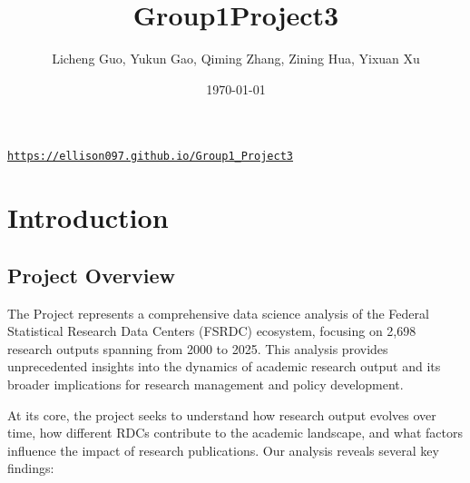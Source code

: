 \documentclass[12pt]{article}
\title{Group1Project3}
\author{Licheng Guo, Yukun Gao, Qiming Zhang, Zining Hua, Yixuan Xu}
\date{\today}
\begin{document}
\maketitle  
\begin{center}
  \href{https://ellison097.github.io/Group1_Project3}{\texttt{https://ellison097.github.io/Group1\_Project3}}
\end{center}

\tableofcontents
\newpage

\section{Introduction}

\subsection{Project Overview}
The Project represents a comprehensive data science analysis of the Federal Statistical Research Data Centers (FSRDC) ecosystem, focusing on 2,698 research outputs spanning from 2000 to 2025. This analysis provides unprecedented insights into the dynamics of academic research output and its broader implications for research management and policy development.

At its core, the project seeks to understand how research output evolves over time, how different RDCs contribute to the academic landscape, and what factors influence the impact of research publications. Our analysis reveals several key findings:
\end{document}

